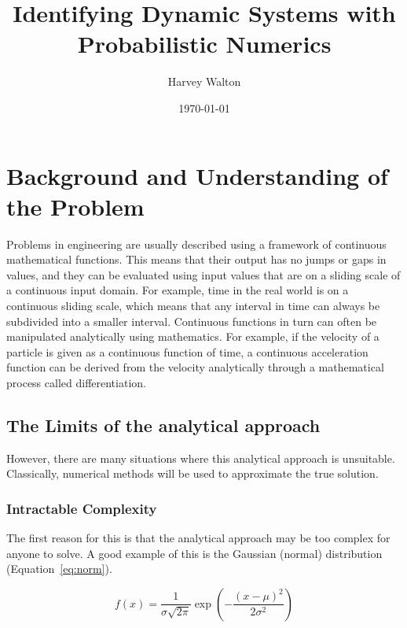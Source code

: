 \documentclass[12pt]{article}
\title{Identifying Dynamic Systems with Probabilistic Numerics}
\author{Harvey Walton}
\date{\today}
\begin{document}

    \thispagestyle{empty}
    


    \tableofcontents
    \newpage


    \section{Background and Understanding of the Problem}


    Problems in engineering are usually described using a framework of continuous mathematical functions.
    This means that their output has no jumps or gaps in values, and they can be evaluated using input values that are on a sliding scale of a continuous input domain.
    For example, time in the real world is on a continuous sliding scale, which means that any interval in time can always be subdivided into a smaller interval.
    Continuous functions in turn can often be manipulated analytically using mathematics.
    For example, if the velocity of a particle is given as a continuous function of time, a continuous acceleration function can be derived from the velocity analytically through a mathematical process called differentiation.

    \subsection{The Limits of the analytical approach}

    However, there are many situations where this analytical approach is unsuitable.
    Classically, numerical methods will be used to approximate the true solution.

    \subsubsection{Intractable Complexity}

    The first reason for this is that the analytical approach may be too complex for anyone to solve.
    A good example of this is the Gaussian (normal) distribution (Equation~\ref{eq:norm}). %

    \begin{equation}
        f(x) = \frac{1}{\sigma\sqrt{2\pi}} \exp\left(-\frac{(x - \mu)^2}{2\sigma^2}\right)\label{eq:norm}
    \end{equation}
\end{document}
